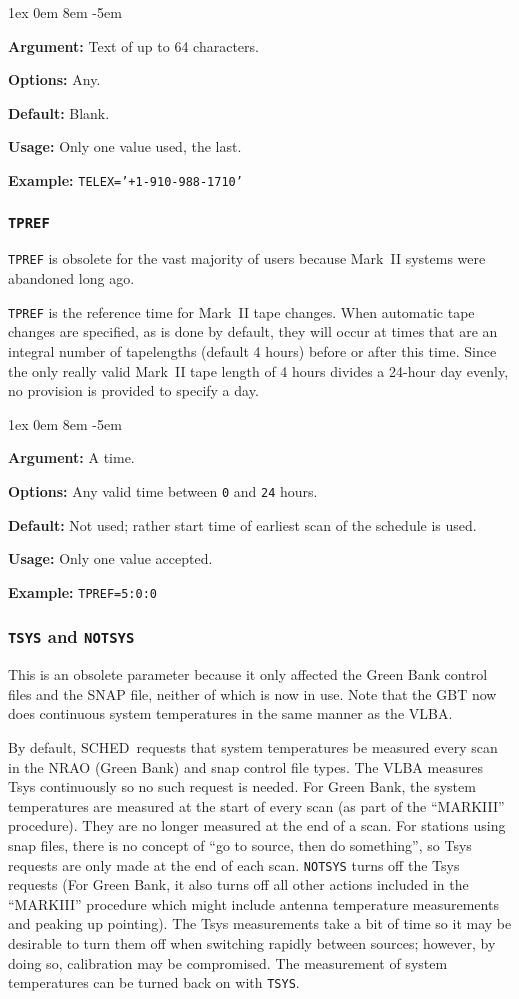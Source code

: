 \documentclass{report}
\newcommand{\schedb}{{\sc SCHED~}}
\newcommand{\rcwbox}[5]{
  \begin{list}{}{\parsep 1ex  \itemsep 0em
                 \leftmargin 8em  \itemindent -5em }
    \item {\bf Argument:} #1
    \item {\bf Options:}  #2
    \item {\bf Default:}  #3
    \item {\bf Usage:}    #4
    \item {\bf Example:}  #5
  \end{list}
}
\begin{document}
\rcwbox
{Text of up to 64 characters.}
{Any.}
{Blank.}
{Only one value used, the last.}
{{\tt TELEX='+1-910-988-1710'}}


\subsubsection{\label{MP:TPREF}{\tt TPREF}}

{\tt TPREF} is obsolete for the vast majority of users because Mark~II
systems were abandoned long ago.

{\tt TPREF} is the reference time for Mark~II tape changes. When
automatic tape changes are specified, as is done by default, they will
occur at times that are an integral number of tapelengths (default 4
hours) before or after this time.  Since the only really valid Mark~II
tape length of 4 hours divides a 24-hour day evenly, no provision is
provided to specify a day.

\rcwbox
{A time.}
{Any valid time between {\tt 0} and {\tt 24} hours.}
{Not used; rather start time of earliest scan of the schedule is used.}
{Only one value accepted.}
{{\tt TPREF=5:0:0}}


\subsubsection{\label{MP:TSYS}{\tt TSYS} and {\tt NOTSYS}}

This is an obsolete parameter because it only affected the Green Bank
control files and the SNAP file, neither of which is now in use.  Note
that the GBT now does continuous system temperatures in the same manner
as the VLBA.

By default, \schedb requests that system temperatures be measured
every scan in the NRAO (Green Bank) and snap control file types. The
VLBA measures Tsys continuously so no such request is
needed. For Green Bank, the system temperatures are measured at the
start of every scan (as part of the ``MARKIII'' procedure).  They are
no longer measured at the end of a scan.  For stations using snap
files, there is no concept of ``go to source, then do something'', so
Tsys requests are only made at the end of each scan. {\tt NOTSYS}
turns off the Tsys requests (For Green Bank, it also turns off all
other actions included in the ``MARKIII'' procedure which might
include antenna temperature measurements and peaking up pointing). The
Tsys measurements take a bit of time so it may be desirable to turn
them off when switching rapidly between sources; however, by doing so,
calibration may be compromised.  The measurement of system
temperatures can be turned back on with {\tt TSYS}.
\end{document}
